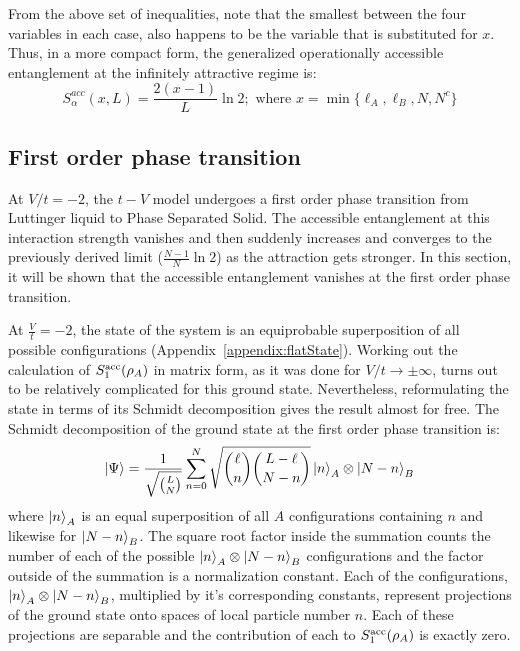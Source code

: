 %
From the above set of inequalities, note that the smallest between the four variables in each case, also happens to be the variable that is substituted for $x$. Thus, in a more compact form, the generalized operationally accessible entanglement at the infinitely attractive regime is:
%
\begin{equation}
S_\alpha^{acc}(x,L) = \frac{2(x-1)}{L} \ln{2} ; \text{ where } x = \min{\{ \ell_A, \ell_B, N, N^c \} }
\end{equation}
%
	\subsection{First order phase transition}
	
At $V/t = -2$, the $t-V$ model undergoes a first order phase transition from Luttinger liquid to Phase Separated Solid. The accessible entanglement at this interaction strength vanishes and then suddenly increases and converges to the previously derived limit ($\frac{N-1}{N}\ln{2}$) as the attraction gets stronger. In this section, it will be shown that the accessible entanglement vanishes at the first order phase transition.

At $\frac{V}{t}=-2$, the state of the system is an equiprobable superposition of all possible configurations (Appendix~\ref{appendix:flatState}). Working out the calculation of $S_1^{\rm acc}(\rho_A)$ in matrix form, as it was done for $V/t\to\pm\infty$, turns out to be relatively complicated for this ground state. Nevertheless, reformulating the state in terms of its Schmidt decomposition gives the result almost for free. The Schmidt decomposition of the ground state at the first order phase transition is:
%
\begin{equation}
\ket{\Psi} = \frac{1}{\sqrt{{{L}\choose{N}}}} \sum_{n=0}^{N} \sqrt{{{\ell}\choose{n}}{{L-\ell}\choose{N-n}}} \ket{n}_A \otimes \ket{N-n}_B
\end{equation}
%
where $\ket{n}_A$ is an equal superposition of all $A$ configurations containing $n$ and likewise for $\ket{N-n}_B$. The square root factor inside the summation counts the number of each of the possible $\ket{n}_A \otimes \ket{N-n}_B$ configurations and the factor outside of the summation is a normalization constant. Each of the configurations, $\ket{n}_A \otimes \ket{N-n}_B$, multiplied by it's corresponding constants, represent projections of the ground state onto spaces of local particle number $n$. Each of these projections are  separable and the contribution of each to $S_1^{\rm acc}(\rho_A)$ is exactly zero. 

